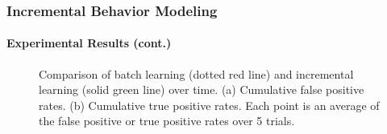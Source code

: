 
\begin{frame}
    \frametitle{Incremental Behavior Modeling}
    \framesubtitle{Experimental Results (cont.)}

    \begin{figure}
        \centering
        \caption{Comparison of batch learning (dotted red line) and
            incremental learning (solid green line) over time.  (a) Cumulative
            false positive rates. (b) Cumulative true positive rates.  Each
            point is an average of the false positive or true positive rates
            over 5 trials.}
        \label{fig:chunking-results}
    \end{figure}

\end{frame}


